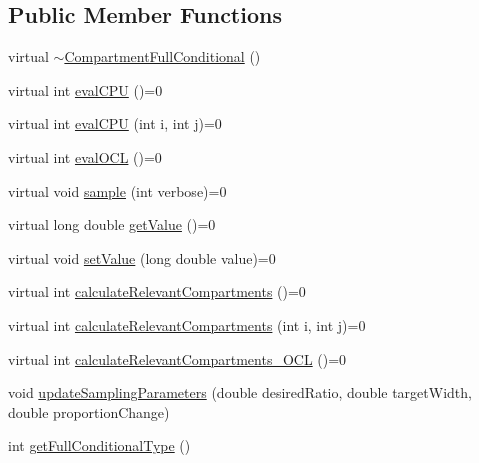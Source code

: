 \subsection*{Public Member Functions}
\begin{DoxyCompactItemize}
\item 
virtual \hyperlink{classSpatialSEIR_1_1CompartmentFullConditional_a7dd59bdf5663913955fb61573e7a5f1f}{$\sim$\-Compartment\-Full\-Conditional} ()
\item 
virtual int \hyperlink{classSpatialSEIR_1_1CompartmentFullConditional_ad2402c8d7fc0b362482bcd5ceaa035af}{eval\-C\-P\-U} ()=0
\item 
virtual int \hyperlink{classSpatialSEIR_1_1CompartmentFullConditional_a92d48bc8cd13ff048791edbdcc453479}{eval\-C\-P\-U} (int i, int j)=0
\item 
virtual int \hyperlink{classSpatialSEIR_1_1CompartmentFullConditional_ac7c7b1191508d49a56ec739449bf93d4}{eval\-O\-C\-L} ()=0
\item 
virtual void \hyperlink{classSpatialSEIR_1_1CompartmentFullConditional_a436ae9e47f7a4269f0a78ce225e6b7f3}{sample} (int verbose)=0
\item 
virtual long double \hyperlink{classSpatialSEIR_1_1CompartmentFullConditional_a28794be23ee7f6fcba96ff2bee63e065}{get\-Value} ()=0
\item 
virtual void \hyperlink{classSpatialSEIR_1_1CompartmentFullConditional_a22ab4dcc354c8ebc4f619685bc32dfae}{set\-Value} (long double value)=0
\item 
virtual int \hyperlink{classSpatialSEIR_1_1CompartmentFullConditional_a71836271b0997117f3b8437c2f55a986}{calculate\-Relevant\-Compartments} ()=0
\item 
virtual int \hyperlink{classSpatialSEIR_1_1CompartmentFullConditional_a21440bf07bd554a2893a328713bfe09f}{calculate\-Relevant\-Compartments} (int i, int j)=0
\item 
virtual int \hyperlink{classSpatialSEIR_1_1CompartmentFullConditional_ab873ecc59f7639637113d885ab89bed4}{calculate\-Relevant\-Compartments\-\_\-\-O\-C\-L} ()=0
\item 
void \hyperlink{classSpatialSEIR_1_1CompartmentFullConditional_a58274416df32eebb57ccf350601a10cd}{update\-Sampling\-Parameters} (double desired\-Ratio, double target\-Width, double proportion\-Change)
\item 
int \hyperlink{classSpatialSEIR_1_1CompartmentFullConditional_a9e5c2af82aac7179f59ff937c7dcf89d}{get\-Full\-Conditional\-Type} ()
\end{DoxyCompactItemize}
